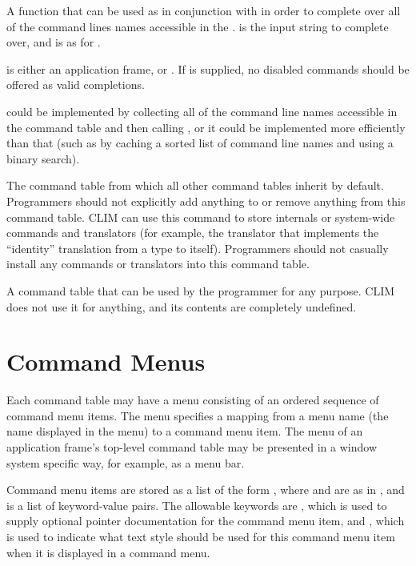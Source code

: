 A function that can be used as in conjunction with  in order
to complete over all of the command lines names accessible in the  .   is the input string to complete over,
and  is as for .

 is either an application frame, or .  If  is
supplied, no disabled commands should be offered as valid completions.

 could be implemented by collecting all of the
command line names accessible in the command table and then calling
, or it could be implemented more efficiently
than that (such as by caching a sorted list of command line names and using a
binary search).



The command table from which all other command tables inherit by default.
Programmers should not explicitly add anything to or remove anything from this
command table.  CLIM can use this command to store internals or system-wide
commands and translators (for example, the translator that implements the
``identity'' translation from a type to itself).  Programmers should not
casually install any commands or translators into this command table.


A command table that can be used by the programmer for any purpose.  CLIM does
not use it for anything, and its contents are completely undefined.


\section {Command Menus}

Each command table may have a menu consisting of an ordered sequence of command
menu items.  The menu specifies a mapping from a menu name (the name displayed
in the menu) to a command menu item.  The menu of an application frame's
top-level command table may be presented in a window system specific way, for
example, as a menu bar.

Command menu items are stored as a list of the form
, where  and 
are as in , and  is a list of
keyword-value pairs.  The allowable keywords are , which is
used to supply optional pointer documentation for the command menu item, and
, which is used to indicate what text style should be used for
this command menu item when it is displayed in a command menu.

